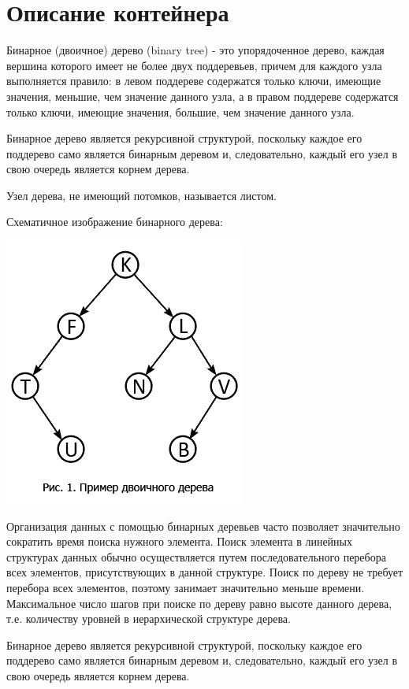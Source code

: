 \section{Описание контейнера}
Бинарное (двоичное) дерево (binary tree) - это упорядоченное дерево, каждая вершина которого имеет не более двух поддеревьев, причем для каждого узла выполняется правило: в левом поддереве содержатся только ключи, имеющие значения, меньшие, чем значение данного узла, а в правом поддереве содержатся только ключи, имеющие значения, большие, чем значение данного узла.

Бинарное дерево является рекурсивной структурой, поскольку каждое его поддерево само является бинарным деревом и, следовательно, каждый его узел в свою очередь является корнем дерева.

Узел дерева, не имеющий потомков, называется листом.

Схематичное изображение бинарного дерева:
\begin{center}\includegraphics{1.png}\end{center}

Организация данных с помощью бинарных деревьев часто позволяет значительно сократить время поиска нужного элемента. Поиск элемента в линейных структурах данных обычно осуществляется путем последовательного перебора всех элементов, присутствующих в данной структуре. Поиск по дереву не требует перебора всех элементов, поэтому занимает значительно меньше времени. Максимальное число шагов при поиске по дереву равно высоте данного дерева, т.е. количеству уровней в иерархической структуре дерева.

Бинарное дерево является рекурсивной структурой, поскольку каждое его поддерево само является бинарным деревом и, следовательно, каждый его узел в свою очередь является корнем дерева.

